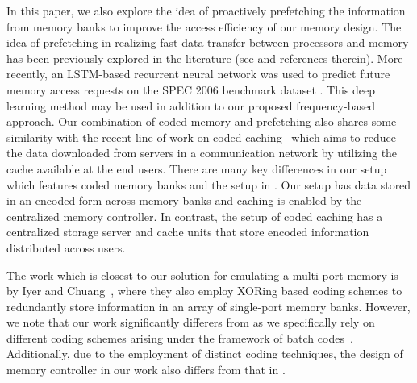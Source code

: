 In this paper, we also explore the idea of proactively prefetching the information from memory banks to improve the access efficiency of our memory design. The idea of prefetching in realizing fast data transfer between processors and memory has been previously explored in the literature (see \cite{Kim2016, Kadjo2014, Shevgoor2015, JL2013} and references therein). 
More recently, an LSTM-based recurrent neural network was used to predict future memory access requests on the SPEC 2006 benchmark dataset \cite{lstm2018}. This deep learning method may be used in addition to our proposed frequency-based approach.
Our combination of coded memory and prefetching also shares some similarity with the recent line of work on coded caching~\cite{MN16a} which aims to reduce the data downloaded from servers in a communication network by utilizing the cache available at the end users. There are many key differences in our setup which features coded memory banks and the setup in \cite{MN16a}. Our setup has data stored in an encoded form across memory banks and caching is enabled by the centralized memory controller. In contrast, the setup of coded caching has a centralized storage server and cache units that store encoded information distributed across users.

The work which is closest to our solution for emulating a multi-port memory is by Iyer and Chuang~\cite{Memoir_xor, Memoir_xor_virtual}, where they also employ XORing based coding schemes to redundantly store information in an array of single-port memory banks. However, we note that our work significantly differers from \cite{Memoir_xor, Memoir_xor_virtual} as we specifically rely on different coding schemes arising under the framework of batch codes~\cite{batchcodes}. Additionally, due to the employment of distinct coding techniques, the design of memory controller in our work also differs from that in \cite{Memoir_xor, Memoir_xor_virtual}.

